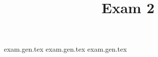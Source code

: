 

\title{Exam 2}
\date{}



\examcover

{exam.gen.tex}
\newpage
{exam.gen.tex}
\newpage
{exam.gen.tex}


